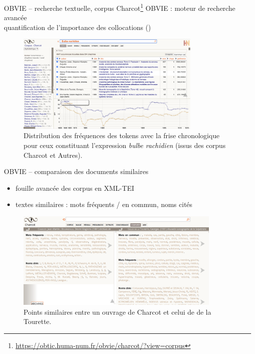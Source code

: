 \begin{frame}{OBVIE -- recherche textuelle, corpus Charcot\footnote{\url{https://obtic.huma-num.fr/obvie/charcot/?view=corpus}}}
\textsc{OBVIE} : moteur de recherche avancée {\small\citep{alrahabi2022obvie}}\\
{\small \danger quantification de l'importance des \og{}collocations\fg{} (\cite{nerima2006})}
\begin{figure}[!h]
    \centering
\includegraphics[width=90mm,scale=0.5]{pic/bulbe_rachidien_mini.png}
    \caption{Distribution des fréquences des tokens avec la frise chronologique pour ceux constituant l'expression \textit{bulbe rachidien} (issus des corpus \og{}Charcot\fg{} et \og{}Autres\fg{}).}
    \label{fig:my_label}
\end{figure}
\end{frame}

\begin{frame}{OBVIE -- comparaison des documents similaires}
\begin{itemize}
\item fouille avancée des corpus en \textsc{XML-TEI}
\item textes similaires : mots fréquents / en commun, noms cités
\end{itemize}
\begin{figure}[!h]
    \centering
\includegraphics[width=100mm,scale=0.5]{pic/doc_sim.png}
    \caption{Points similaires entre un ouvrage de Charcot et celui de de la Tourette.}
    \label{fig:my_label}
\end{figure}
\end{frame}

